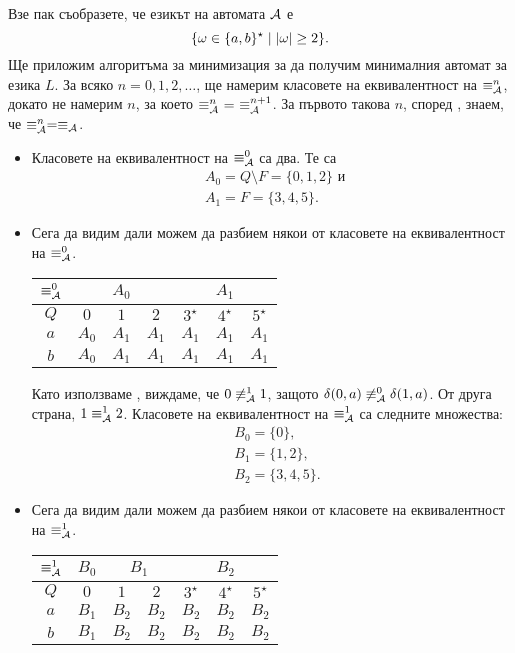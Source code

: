 \begin{extra2}
\begin{example}
{      \writedown Взе пак съобразете, че езикът на автомата $\mathcal{A}$ е \[\{\omega \in \{a,b\}^\star \mid \vert{\omega}\vert \geq 2\}.\]}
  Ще приложим алгоритъма за минимизация за да получим минималния автомат за езика $L$.
  За всяко $n = 0,1,2,\dots$, ще намерим класовете на еквивалентност на $\equiv^n_{\mathcal{A}}$,
  докато не намерим $n$, за което $\equiv^n_\A\ =\ \equiv^{n+1}_\A$.
  За първото такова $n$, според , знаем, че $\equiv^n_{\mathcal{A}} = \equiv_{\mathcal{A}}$.
  \begin{itemize}
  \item 
    Класовете на еквивалентност на $\equiv^0_{\mathcal{A}}$ са два. Те са
    \begin{align*}
      & A_0 = Q\setminus F = \{0,1,2\}\text{ и }\\
      & A_1 = F = \{3,4,5\}.
    \end{align*}
  \item
    Сега да видим дали можем да разбием някои от класовете на еквивалентност на $\equiv^0_{\mathcal{A}}$.
    \begin{tabular}{|c|c|c|c|c|c|c|}
      \hline
      $\equiv^0_{\mathcal{A}}$ & \multicolumn{3}{|c|}{$A_0$} & \multicolumn{3}{|c|}{$A_1$}\\
      \hline
      \hline
      $Q$ & $0$ & $1$ & $2$ & $3^\star$ & $4^\star$ & $5^\star$ \\
      \hline
      $a$ & $A_0$& $A_1$ & $A_1$ & $A_1$ & $A_1$ & $A_1$\\
      \hline
      $b$ & $A_0$& $A_1$ & $A_1$ & $A_1$ & $A_1$ & $A_1$\\
      \hline
    \end{tabular}
    
    Като използваме , виждаме, че $0 \not\equiv^1_{\mathcal{A}} 1$, защото $\delta(0,a) \not\equiv^0_{\mathcal{A}} \delta(1,a)$.
    От друга страна, $1 \equiv^1_{\mathcal{A}} 2$.
    Класовете на еквивалентност на $\equiv^1_{\mathcal{A}}$ са следните множества:
    \begin{align*}
      & B_0 = \{0\},\\
      & B_1 = \{1,2\},\\
      & B_2 = \{3,4,5\}.
    \end{align*}
  \item
    Сега да видим дали можем да разбием някои от класовете на еквивалентност на $\equiv^1_{\mathcal{A}}$.
    
    \begin{tabular}{|c|c|c|c|c|c|c|}
      \hline
      $\equiv^1_{\mathcal{A}}$ & $B_0$ & \multicolumn{2}{|c|}{$B_1$} & \multicolumn{3}{|c|}{$B_2$}\\
      \hline
      \hline
      $Q$ & $0$ & $1$ & $2$ & $3^\star$ & $4^\star$ & $5^\star$ \\
      \hline
      $a$ & $B_1$ & $B_2$ & $B_2$ & $B_2$ & $B_2$ & $B_2$\\
      \hline
      $b$ & $B_1$ & $B_2$ & $B_2$ & $B_2$ & $B_2$ & $B_2$\\
      \hline
    \end{tabular}


\end{itemize}
\end{example}
\end{extra2}
